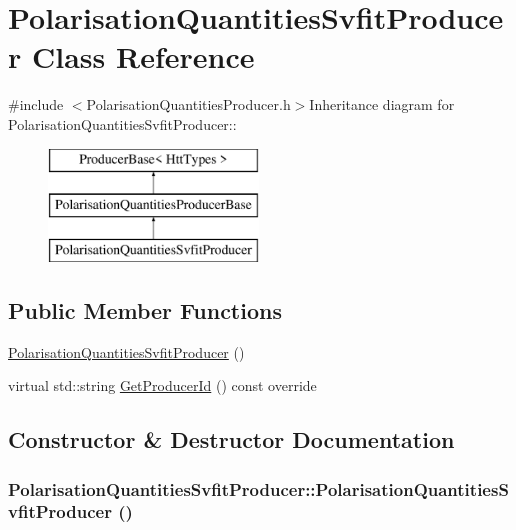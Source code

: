 \hypertarget{classPolarisationQuantitiesSvfitProducer}{
\section{PolarisationQuantitiesSvfitProducer Class Reference}
\label{classPolarisationQuantitiesSvfitProducer}
}


{\ttfamily \#include $<$PolarisationQuantitiesProducer.h$>$}Inheritance diagram for PolarisationQuantitiesSvfitProducer::\begin{figure}[H]
\begin{center}
\leavevmode
\includegraphics[height=3cm]{classPolarisationQuantitiesSvfitProducer}
\end{center}
\end{figure}
\subsection*{Public Member Functions}
\begin{DoxyCompactItemize}
\item 
\hyperlink{classPolarisationQuantitiesSvfitProducer_ac9b1c65c379dac6026684e47c2572d08}{PolarisationQuantitiesSvfitProducer} ()
\item 
virtual std::string \hyperlink{classPolarisationQuantitiesSvfitProducer_ab73197d5c7547a3759f1b22d954cfd58}{GetProducerId} () const override
\end{DoxyCompactItemize}


\subsection{Constructor \& Destructor Documentation}
\hypertarget{classPolarisationQuantitiesSvfitProducer_ac9b1c65c379dac6026684e47c2572d08}{
\subsubsection[{PolarisationQuantitiesSvfitProducer}]{\setlength{\rightskip}{0pt plus 5cm}PolarisationQuantitiesSvfitProducer::PolarisationQuantitiesSvfitProducer ()}}
\label{classPolarisationQuantitiesSvfitProducer_ac9b1c65c379dac6026684e47c2572d08}


